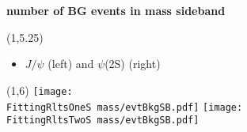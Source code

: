 \documentclass[11pt,slidescentered,red,compress,handout,hyperref={bookmarks=true},mathseriftable]{beamer}
\newcommand{\FittingRltsOneS}{../Psi1S/Fit/parameter/}
\newcommand{\FittingRltsTwoS}{../Psi2S/Fit/parameter/}
\begin{document}
%

\section{}
\begin{frame}[t]{\small \bf number of BG events in mass sideband}{}
\begin{textblock}{48}(1,5.25)
\begin{itemize}
\scriptsize \item $J/\psi$ (left) and $\psi$(2S) (right)
\end{itemize}
\end{textblock}
\begin{textblock}{48}(1,6)
\hspace*{10pt} \texttt{[image: \\FittingRltsOneS mass/evtBkgSB.pdf]}
\hspace*{10pt} \texttt{[image: \\FittingRltsTwoS mass/evtBkgSB.pdf]}
\end{textblock}
\end{frame}
\end{document}

